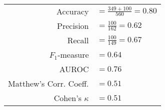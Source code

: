 \begin{tabular}{rl}
\rule{0pt}{12pt} Accuracy & $= \frac{349 + 100}{560} = 0.80$  \tabularnewline
\rule{0pt}{12pt} Precision & $= \frac{100}{162} = 0.62$ \tabularnewline
\rule{0pt}{12pt} Recall & $= \frac{100}{149} = 0.67$  \tabularnewline
\rule{0pt}{12pt} $F_1$-measure & $= 0.64$ \tabularnewline
\rule{0pt}{12pt} AUROC &$= 0.76$ \tabularnewline
\rule{0pt}{12pt} Matthew's Corr. Coeff. & $= 0.51$ \tabularnewline
\rule{0pt}{12pt} Cohen's $\kappa$ & $= 0.51$ \tabularnewline
\end{tabular}
